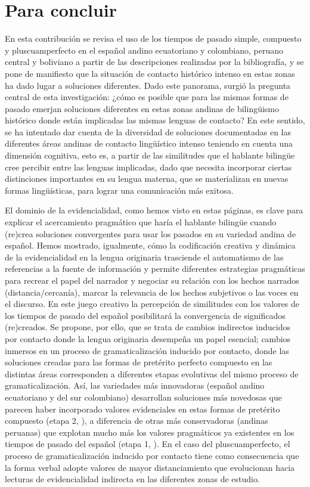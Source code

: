 \documentclass[output=paper]{../langscibook}
\begin{document}
\section{Para concluir}\label{sec:palacios:7}
\largerpage
En esta contribución se revisa el uso de los tiempos de pasado simple, compuesto y pluscuamperfecto en el español andino ecuatoriano y colombiano, peruano central y boliviano a partir de las descripciones realizadas por la bibliografía, y se pone de manifiesto que la situación de contacto histórico intenso en estas zonas ha dado lugar a soluciones diferentes. Dado este panorama, surgió la pregunta central de esta investigación: ¿cómo es posible que para las mismas formas de pasado emerjan soluciones diferentes en estas zonas andinas de bilingüismo histórico donde están implicadas las mismas lenguas de contacto? En este sentido, se ha intentado dar cuenta de la diversidad de soluciones documentadas en las diferentes áreas andinas de contacto lingüístico intenso teniendo en cuenta una dimensión cognitiva, esto es, a partir de las similitudes que el hablante bilingüe cree percibir entre las lenguas implicadas, dado que necesita incorporar ciertas distinciones importantes en su lengua materna, que se materializan en nuevas formas lingüísticas, para lograr una comunicación más exitosa. 

El dominio de la evidencialidad, como hemos visto en estas páginas, es clave para explicar el acercamiento pragmático que haría el hablante bilingüe cuando (re)crea soluciones convergentes para usar los pasados en su variedad andina de español. Hemos mostrado, igualmente, cómo la codificación creativa y dinámica de la evidencialidad en la lengua originaria trasciende el automatismo de las referencias a la fuente de información y permite diferentes estrategias pragmáticas para recrear el papel del narrador y negociar su relación con los hechos narrados (distancia/cercanía), marcar la relevancia de los hechos subjetivos o las voces en el discurso. En este juego creativo la percepción de similitudes con los valores de los tiempos de pasado del español posibilitará la convergencia de significados (re)creados. Se propone, por ello, que se trata de cambios indirectos inducidos por contacto donde la lengua originaria desempeña un papel esencial; cambios inmersos en un proceso de gramaticalización inducido por contacto, donde las soluciones creadas para las formas de pretérito perfecto compuesto en las distintas áreas corresponden a diferentes etapas evolutivas del mismo proceso de gramaticalización. Así, las variedades más innovadoras (español andino ecuatoriano y del sur colombiano) desarrollan soluciones más novedosas que parecen haber incorporado valores evidenciales en estas formas de pretérito compuesto (etapa 2, ), a diferencia de otras más conservadoras (andinas peruanas) que explotan mucho más los valores pragmáticos ya existentes en los tiempos de pasado del español (etapa 1, ). En el caso del pluscuamperfecto, el proceso de gramaticalización inducido por contacto tiene como consecuencia que la forma verbal adopte valores de mayor distanciamiento que evolucionan hacia lecturas de evidencialidad indirecta en las diferentes zonas de estudio.
\end{document}
